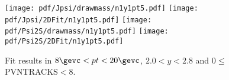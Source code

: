 \begin{figure}[H]
\begin{center}
\texttt{[image: pdf/Jpsi/drawmass/n1y1pt5.pdf]}
\texttt{[image: pdf/Jpsi/2DFit/n1y1pt5.pdf]}
\vspace*{-0.5cm}
\texttt{[image: pdf/Psi2S/drawmass/n1y1pt5.pdf]}
\texttt{[image: pdf/Psi2S/2DFit/n1y1pt5.pdf]}
\vspace*{-0.5cm}
\end{center}
\caption{Fit results in $8\gevc<pt<20\gevc$, $2.0<y<2.8$ and 0$\leq$PVNTRACKS$<$8.}
\label{Fitn1y1pt5}
\end{figure}
